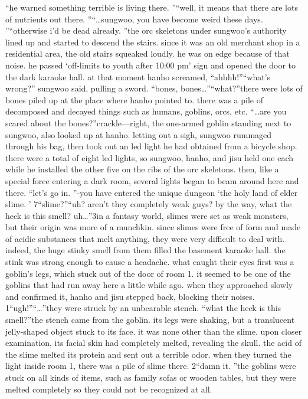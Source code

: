 “he warned something terrible is living there.
”“well, it means that there are lots of nutrients out there.
”“…sungwoo, you have become weird these days.
”“otherwise i’d be dead already.
”the orc skeletons under sungwoo’s authority lined up and started to descend the stairs.
since it was an old merchant shop in a residential area, the old stairs squeaked loudly.
he was on edge because of that noise.
 he passed ‘off-limits to youth after 10:00 pm’ sign and opened the door to the dark karaoke hall.
at that moment hanho screamed, “ahhhh!”“what’s wrong?” sungwoo said, pulling a sword.
“bones, bones…”“what?”there were lots of bones piled up at the place where hanho pointed to.
 there was a pile of decomposed and decayed things such as humans, goblins, orcs, etc.
“…are you scared about the bones?”crackle—right, the one-armed goblin standing next to sungwoo, also looked up at hanho.
letting out a sigh, sungwoo rummaged through his bag, then took out an led light he had obtained from a bicycle shop.
 there were a total of eight led lights, so sungwoo, hanho, and jisu held one each while he installed the other five on the ribs of the orc skeletons.
then, like a special force entering a dark room, several lights began to beam around here and there.
“let’s go in.
”-you have entered the unique dungeon ‘the holy land of elder slime.
’
7“slime?”“uh? aren’t they completely weak guys? by the way, what the heck is this smell? uh…”3in a fantasy world, slimes were set as weak monsters, but their origin was more of a munchkin.
since slimes were free of form and made of acidic substances that melt anything, they were very difficult to deal with.
 indeed, the huge stinky smell from them filled the basement karaoke hall.
 the stink was strong enough to cause a headache.
what caught their eyes first was a goblin’s legs, which stuck out of the door of room 1.
 it seemed to be one of the goblins that had run away here a little while ago.
when they approached slowly and confirmed it, hanho and jisu stepped back, blocking their noises.
1“ugh!”“…”they were struck by an unbearable stench.
“what the heck is this smell?”the stench came from the goblin.
 its legs were shaking, but a translucent jelly-shaped object stuck to its face.
 it was none other than the slime.
upon closer examination, its facial skin had completely melted, revealing the skull.
 the acid of the slime melted its protein and sent out a terrible odor.
 when they turned the light inside room 1, there was a pile of slime there.
2“damn it.
”the goblins were stuck on all kinds of items, such as family sofas or wooden tables, but they were melted completely so they could not be recognized at all.
